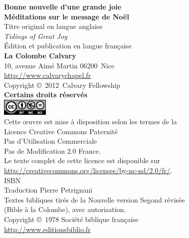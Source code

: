 \newpage
\mbox{}
\vfill

{\scriptsize\liningfont

\textbf{Bonne nouvelle d'une grande joie\\
 Méditations sur le message de No\"el} \\

Titre original en langue anglaise\frcolon{}\\
\emph{Tidings of Great Joy} \\

Édition et publication en langue fran\c{c}aise\frcolon{}\\
 {\bfseries La Colombe Calvary}\\
 10, avenue Aimé Martin \mybullet{} 06200~Nice\\
 \url{http://www.calvarychapel.fr} \\

Copyright \copyright{}~2012~Calvary Fellowship \\

\textbf{Certains droits réservés} \\

\includegraphics[width=6em]{by-nc-nd_eu} \\

Cette \oe{}uvre est mise à disposition selon les termes de la \\
 Licence Creative Commons Paternité \\
 \ocadr Pas d'Utilisation Commerciale \\
 \ocadr Pas de Modification 2.0 France. \\

Le texte complet de cette licence est disponible sur \\
 \url{http://creativecommons.org/licenses/by-nc-nd/2.0/fr/}. \\

ISBN~\isbn \\

Traduction\frcolon{} Pierre Petrignani \\

Textes bibliques tirés de la Nouvelle version Segond révisée \\
 (Bible à la Colombe), avec autorisation. \\
 Copyright \copyright{}~1978 Société biblique fran\c{c}aise \\
 \url{http://www.editionsbiblio.fr}

}
\pagebreak

